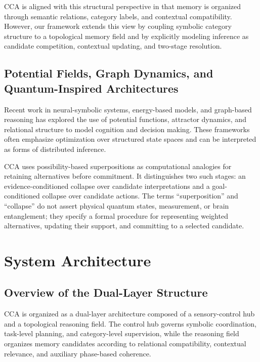 \documentclass[10pt,journal,compsoc]{IEEEtran}
\begin{document}
CCA is aligned with this structural perspective in that memory is organized through semantic relations, category labels, and contextual compatibility. However, our framework extends this view by coupling symbolic category structure to a topological memory field and by explicitly modeling inference as candidate competition, contextual updating, and two-stage resolution.

\subsection{Potential Fields, Graph Dynamics, and Quantum-Inspired Architectures}

Recent work in neural-symbolic systems, energy-based models, and graph-based reasoning has explored the use of potential functions, attractor dynamics, and relational structure to model cognition and decision making. These frameworks often emphasize optimization over structured state spaces and can be interpreted as forms of distributed inference.

CCA uses possibility-based superpositions as computational analogies for retaining alternatives before commitment. It distinguishes two such stages: an evidence-conditioned collapse over candidate interpretations and a goal-conditioned collapse over candidate actions. The terms ``superposition'' and ``collapse'' do not assert physical quantum states, measurement, or brain entanglement; they specify a formal procedure for representing weighted alternatives, updating their support, and committing to a selected candidate.

\section{System Architecture}
\subsection{Overview of the Dual-Layer Structure}

CCA is organized as a dual-layer architecture composed of a sensory-control hub and a topological reasoning field. The control hub governs symbolic coordination, task-level planning, and category-level supervision, while the reasoning field organizes memory candidates according to relational compatibility, contextual relevance, and auxiliary phase-based coherence.
\end{document}
